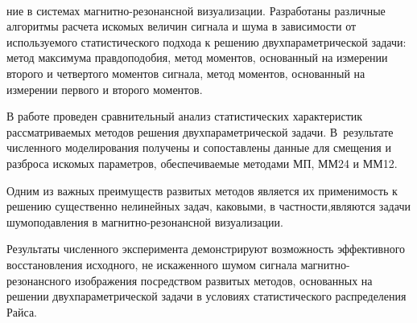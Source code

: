      \begin{figure} %
     \vspace*{1pt}
\begin{center}
\mbox{%
\epsfxsize=147mm
}
\end{center}
\vspace*{-9pt}
     \end{figure}

\begin{multicols}{2}

\noindent
ние в сис\-те\-мах маг\-нит\-но-ре\-зо\-нанс\-ной визуализации. Разработаны различные
алгоритмы расчета искомых величин сигнала и шума в зависимости от используемого
статистического подхода к решению двухпараметрической задачи: метод максимума
правдоподобия, метод моментов, основанный на измерении второго и четвертого
моментов сигнала, метод моментов, основанный на измерении первого и второго
моментов.

    В работе проведен сравнительный анализ статистических характеристик
рассматриваемых методов решения двухпараметрической задачи. В~результате
численного моделирования получены и со\-по\-став\-ле\-ны данные для смещения и разброса
искомых параметров, обеспечиваемые методами МП, ММ24 и ММ12.

    Одним из важных преимуществ развитых методов является их применимость к
решению существенно нелинейных задач, каковыми, в част\-ности,\linebreak являются задачи
шумоподавления в маг\-нит\-но-ре\-зо\-нансной визуализации.

    Результаты численного эксперимента демонстрируют возможность эффективного
восстановления исходного, не искаженного шумом сигнала магнитно-резонансного
изображения посредством развитых методов, основанных на решении
двухпараметрической задачи в условиях статистического распределения Райса.


\end{multicols}
